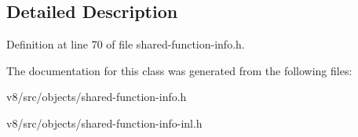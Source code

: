 \subsection{Detailed Description}


Definition at line 70 of file shared-\/function-\/info.\+h.



The documentation for this class was generated from the following files\+:\begin{DoxyCompactItemize}
\item 
v8/src/objects/shared-\/function-\/info.\+h\item 
v8/src/objects/shared-\/function-\/info-\/inl.\+h\end{DoxyCompactItemize}
